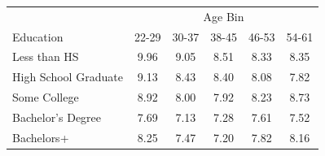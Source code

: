 \begin{tabular}{lccccc}
\hline\hline
 & \multicolumn{5}{c}{Age Bin} \\
Education & 22-29 & 30-37 & 38-45 & 46-53 & 54-61 \\
\hline
Less than HS&9.96&9.05&8.51&8.33&8.35\\
High School Graduate&9.13&8.43&8.40&8.08&7.82\\
Some College&8.92&8.00&7.92&8.23&8.73\\
Bachelor's Degree&7.69&7.13&7.28&7.61&7.52\\
Bachelors+&8.25&7.47&7.20&7.82&8.16\\
\hline\hline
\end{tabular}
